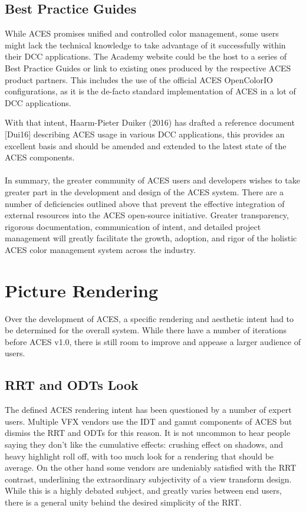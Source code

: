 \documentclass[conference]{IEEEtran}
\begin{document}
\subsection{Best Practice Guides}
While ACES promises unified and controlled color management, some users might lack the technical knowledge to take advantage of it successfully within their DCC applications. The Academy website could be the host to a series of Best Practice Guides or link to existing ones produced by the respective ACES product partners. This includes the use of the official ACES OpenColorIO configurations, as it is the de-facto standard implementation of ACES in a lot of DCC applications. 

With that intent, Haarm-Pieter Duiker (2016) has drafted a reference document [Dui16] describing ACES usage in various DCC applications, this provides an excellent basis and should be amended and extended to the latest state of the ACES components.
\\ \\
In summary, the greater community of ACES users and developers wishes to take greater part in the development and design of the ACES system. There are a number of deficiencies outlined above that prevent the effective integration of external resources into the ACES open-source initiative. Greater transparency, rigorous documentation, communication of intent, and detailed project management will greatly facilitate the growth, adoption, and rigor of the holistic ACES color management system across the industry.

\section{Picture Rendering}

Over the development of ACES, a specific rendering and aesthetic intent had to be determined for the overall system. While there have a number of iterations before ACES v1.0, there is still room to improve and appease a larger audience of users.

\subsection{RRT and ODTs Look}
The defined ACES rendering intent has been questioned by a number of expert users. Multiple VFX vendors use the IDT and gamut components of ACES but dismiss the RRT and ODTs for this reason. It is not uncommon to hear people saying they don't like the cumulative effects: crushing effect on shadows, and heavy highlight roll off, with too much look for a rendering that should be average. On the other hand some vendors are undeniably satisfied with the RRT contrast, underlining the extraordinary subjectivity of a view transform design. While this is a highly debated subject, and greatly varies between end users, there is a general unity behind the desired simplicity of the RRT.
\end{document}
